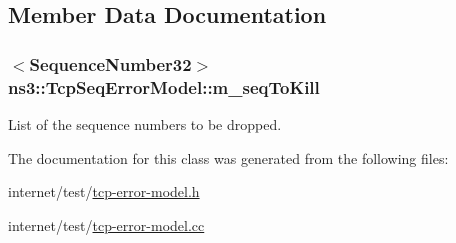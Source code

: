 \subsection{Member Data Documentation}
\subsubsection[{\texorpdfstring{m\+\_\+seq\+To\+Kill}{m_seqToKill}}]{$<${\bf Sequence\+Number32}$>$ ns3\+::\+Tcp\+Seq\+Error\+Model\+::m\+\_\+seq\+To\+Kill\hspace{0.3cm}{\ttfamily [protected]}}\hypertarget{classns3_1_1TcpSeqErrorModel_a6b754afe083cbc3e8f5c1d9e993cd052}{}\label{classns3_1_1TcpSeqErrorModel_a6b754afe083cbc3e8f5c1d9e993cd052}


List of the sequence numbers to be dropped. 



The documentation for this class was generated from the following files\+:\begin{DoxyCompactItemize}
\item 
internet/test/\hyperlink{tcp-error-model_8h}{tcp-\/error-\/model.\+h}\item 
internet/test/\hyperlink{tcp-error-model_8cc}{tcp-\/error-\/model.\+cc}\end{DoxyCompactItemize}
